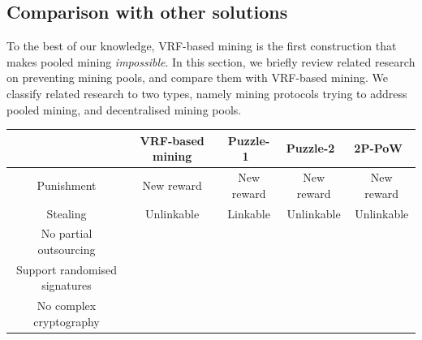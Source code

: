\documentclass[a0,portrait]{a0poster}
\newcommand{\cmark}{\ding{51}}%
\newcommand{\xmark}{\ding{55}}%
\begin{document}
\begin{multicols}{2}
    \section*{Comparison with other solutions}

    To the best of our knowledge, VRF-based mining is the first construction that makes pooled mining \textit{impossible}.
    In this section, we briefly review related research on preventing mining pools, and compare them with VRF-based mining.
    We classify related research to two types, namely mining protocols trying to address pooled mining, and decentralised mining pools.

    \begin{center}
        \begin{tabular}{ccccc}
            \hline
                                          & VRF-based mining & Puzzle-1~\cite{miller2015nonoutsourceable} & Puzzle-2~\cite{miller2015nonoutsourceable} & 2P-PoW~\cite{2P-PoW} \\ \hline
            Punishment                    & New reward       & New reward                                 & New reward                                 & New reward           \\
            Stealing                      & Unlinkable       & Linkable                                   & Unlinkable                                 & Unlinkable           \\
            No partial outsourcing        & \cmark           & \cmark                                     & \cmark                                     & \xmark               \\
            Support randomised signatures & \cmark           & \cmark                                     & \cmark                                     & \xmark               \\
            No complex cryptography       & \cmark           & \cmark                                     & \xmark                                     & \cmark               \\ \hline
        \end{tabular}
    \end{center}


\end{multicols}
\end{document}
